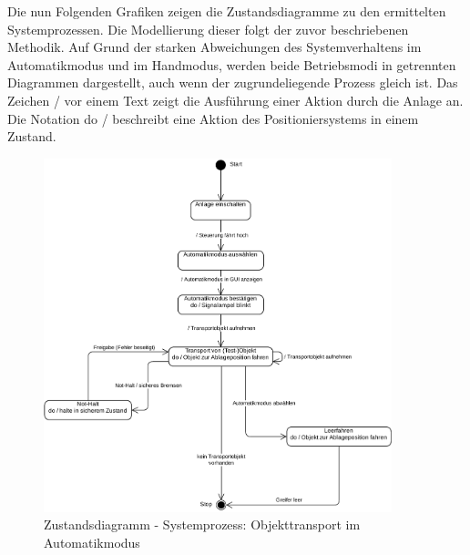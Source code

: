 \documentclass[../../../Bachelorarbeit.tex]{subfiles}
\begin{document}
Die nun Folgenden Grafiken zeigen die Zustandsdiagramme zu den ermittelten Systemprozessen. Die Modellierung dieser folgt der zuvor beschriebenen Methodik. Auf Grund der starken Abweichungen des Systemverhaltens im Automatikmodus und im Handmodus, werden beide Betriebsmodi in getrennten Diagrammen dargestellt, auch wenn der zugrundeliegende Prozess gleich ist. Das Zeichen \glqq /\grqq{} vor einem Text zeigt die Ausführung einer Aktion durch die Anlage an. Die Notation \glqq do /\grqq{} beschreibt eine Aktion des Positioniersystems in einem Zustand.

\begin{figure}[H]
    \centering
    \includegraphics[width=0.9\textwidth]{Images/auto_zustand.pdf}
    \caption[Zustandsdiagramm Automatikmodus]{Zustandsdiagramm - Systemprozess: Objekttransport im Automatikmodus}
    \label{fig:my-img4}
\end{figure}
\end{document}
